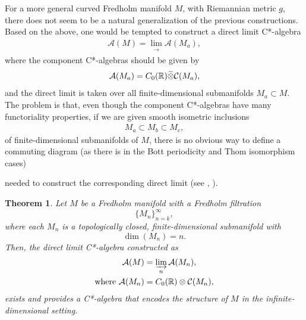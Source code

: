 \documentclass[11pt, twoside, a4paper]{article}
\theoremstyle{mytheoremstyle}
\newtheorem{theorem}{Theorem}[section]
\begin{document}
For a more general curved Fredholm manifold \(M\), with Riemannian metric \(g\), there does not seem to be a natural generalization of the previous constructions. Based on the above, one would be tempted to construct a direct limit C*-algebra 
\begin{align}
    \mathcal{A}(M) = \lim_{\substack{\to}} \mathcal{A}(M_{a}),
\end{align}
where the component C*-algebras should be given by
\begin{align}{\label{M_{a}}}
    \mathcal{A}(M_{a}) = C_{0}(\mathbb{R}) \widetilde{\otimes}\mathcal{C}(M_{a}),
\end{align}
and the direct limit is taken over all finite-dimensional submanifolds \(M_{a} \subset M\). The problem is that, even though the component C*-algebras have many functoriality properties, if we are given smooth isometric inclusions 
\begin{align*}
    M_{a} \subset M_{b} \subset M_{c},
\end{align*}
of finite-dimensional submanifolds of \(M\), there is no obvious way to define a commuting diagram (as there is in the Bott periodicity and Thom isomorphism cases)
\begin{center}
\end{center}
needed to construct the corresponding direct limit (see {\color{blue}\cite{higson1997}}, {\color{blue}\cite{hajac2002}}).
\begin{theorem}
Let \( M \) be a Fredholm manifold with a Fredholm filtration
\[
\{M_{n}\}_{n=k}^{\infty},
\]
where each \( M_{n} \) is a topologically closed, finite-dimensional submanifold with
\[
\operatorname{dim}(M_{n}) = n.
\]
Then, the direct limit C*-algebra constructed as
\begin{align*}
    \mathcal{A}(M) &= \varinjlim_{n} \mathcal{A}(M_{n}), \\
    \text{where } \mathcal{A}(M_{n}) &= C_{0}(\mathbb{R}) \otimes \mathcal{C}(M_{n}),
\end{align*}
exists and provides a C*-algebra that encodes the structure of \( M \) in the infinite-dimensional setting.
\end{theorem}
\end{document}
